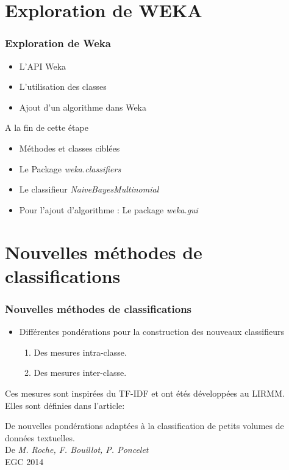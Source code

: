 \documentclass[12pt]{beamer}
\begin{document}
\section{Exploration de WEKA}

\begin{frame}
\frametitle{Exploration de Weka}
\begin{itemize}
\item L'API Weka
\item L'utilisation des classes
\item Ajout d'un algorithme dans Weka
\end{itemize}
\begin{block}{A la fin de cette étape}
\begin{itemize}
\item Méthodes et classes ciblées
\item Le Package \textit{weka.classifiers}
\item Le classifieur \textit{NaiveBayesMultinomial}
\item Pour l'ajout d'algorithme : Le package \textit{weka.gui}
\end{itemize}
\end{block}
\end{frame}

\section{Nouvelles méthodes de classifications}

\begin{frame}
\frametitle{Nouvelles méthodes de classifications}
\begin{itemize}
\item Différentes pondérations pour la construction des nouveaux classifieurs
\begin{enumerate}
\item Des mesures intra-classe.
\item Des mesures inter-classe.
\end{enumerate}
\end{itemize}
Ces mesures sont inspirées du TF-IDF et ont étés développées au LIRMM.\\
Elles sont définies dans l'article:
\begin{center}
De nouvelles pondérations adaptées à la classification de petits volumes de données textuelles.\\
De \textit{M. Roche, F. Bouillot, P. Poncelet}\\
EGC 2014
\end{center}

\end{frame}
\end{document}
